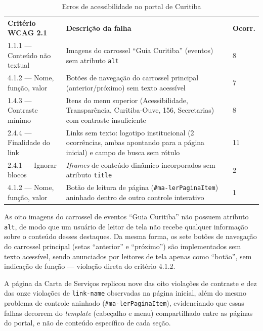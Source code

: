 \documentclass[brazil]{ifpr-pinhais}
\begin{document}
\begin{table}[htb]
\caption{Erros de acessibilidade no portal de Curitiba}
\label{tab:curitiba}
\begin{tabular}{p{3.8cm} p{7cm} p{1.5cm}}
\rowcolor{headerblue}
\color{white}\textbf{Critério WCAG 2.1} & \color{white}\textbf{Descrição da falha} & \color{white}\textbf{Ocorr.} \\
1.1.1 --- Conteúdo não textual & Imagens do carrossel ``Guia Curitiba'' (eventos) sem atributo \texttt{alt} & 8 \\
4.1.2 --- Nome, função, valor & Botões de navegação do carrossel principal (anterior/próximo) sem texto acessível & 7 \\
1.4.3 --- Contraste mínimo    & Itens do menu superior (Acessibilidade, Transparência, Curitiba-Ouve, 156, Secretarias) com contraste insuficiente & 8 \\
2.4.4 --- Finalidade do link  & Links sem texto: logotipo institucional (2 ocorrências, ambas apontando para a página inicial) e campo de busca sem rótulo & 11 \\
2.4.1 --- Ignorar blocos      & \textit{Iframes} de conteúdo dinâmico incorporados sem atributo \texttt{title} & 2 \\
4.1.2 --- Nome, função, valor & Botão de leitura de página (\texttt{\#ma-lerPaginaItem}) aninhado dentro de outro controle interativo & 1 \\
\end{tabular}
\end{table}

As oito imagens do carrossel de eventos ``Guia Curitiba'' não possuem atributo \texttt{alt}, de modo que um usuário de leitor de tela não recebe qualquer informação sobre o conteúdo desses destaques. Da mesma forma, os sete botões de navegação do carrossel principal (setas ``anterior'' e ``próximo'') são implementados sem texto acessível, sendo anunciados por leitores de tela apenas como ``botão'', sem indicação de função --- violação direta do critério 4.1.2.

A página da Carta de Serviços replicou nove das oito violações de contraste e dez das onze violações de \texttt{link-name} observadas na página inicial, além do mesmo problema de controle aninhado (\texttt{\#ma-lerPaginaItem}), evidenciando que essas falhas decorrem do \textit{template} (cabeçalho e menu) compartilhado entre as páginas do portal, e não de conteúdo específico de cada seção.
\end{document}
